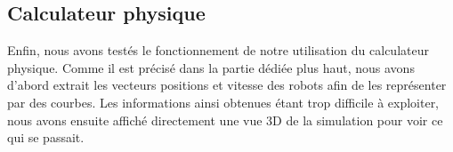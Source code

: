 \subsection{Calculateur physique}

Enfin, nous avons testés le fonctionnement de notre utilisation du calculateur physique. Comme il est précisé dans la partie dédiée plus haut, nous avons d'abord extrait les vecteurs positions et vitesse des robots afin de les représenter par des courbes. Les informations ainsi obtenues étant trop difficile à exploiter, nous avons ensuite affiché directement une vue 3D de la simulation pour voir ce qui se passait.